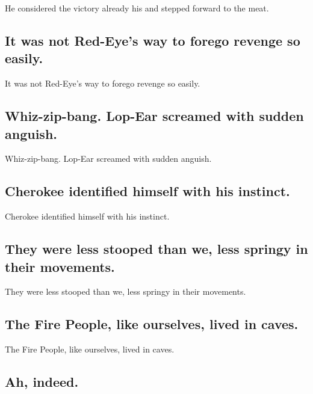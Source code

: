\documentclass[]{article}
\begin{document}
He considered the victory already his and stepped forward to the meat.

\hypertarget{it-was-not-red-eyes-way-to-forego-revenge-so-easily.}{%
\subsection{It was not Red-Eye's way to forego revenge so
easily.}\label{it-was-not-red-eyes-way-to-forego-revenge-so-easily.}}

It was not Red-Eye's way to forego revenge so easily.

\hypertarget{whiz-zip-bang.-lop-ear-screamed-with-sudden-anguish.}{%
\subsection{Whiz-zip-bang. Lop-Ear screamed with sudden
anguish.}\label{whiz-zip-bang.-lop-ear-screamed-with-sudden-anguish.}}

Whiz-zip-bang. Lop-Ear screamed with sudden anguish.

\hypertarget{cherokee-identified-himself-with-his-instinct.}{%
\subsection{Cherokee identified himself with his
instinct.}\label{cherokee-identified-himself-with-his-instinct.}}

Cherokee identified himself with his instinct.

\hypertarget{they-were-less-stooped-than-we-less-springy-in-their-movements.}{%
\subsection{They were less stooped than we, less springy in their
movements.}\label{they-were-less-stooped-than-we-less-springy-in-their-movements.}}

They were less stooped than we, less springy in their movements.

\hypertarget{the-fire-people-like-ourselves-lived-in-caves.}{%
\subsection{The Fire People, like ourselves, lived in
caves.}\label{the-fire-people-like-ourselves-lived-in-caves.}}

The Fire People, like ourselves, lived in caves.

\hypertarget{ah-indeed.}{%
\subsection{Ah, indeed.}\label{ah-indeed.}}
\end{document}
